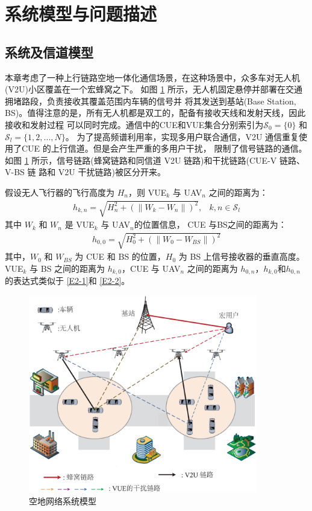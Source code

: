 \section{系统模型与问题描述}\label{section2-2}
\subsection{系统及信道模型}\label{section2-2-1}
本章考虑了一种上行链路空地一体化通信场景，在这种场景中，众多车对无人机(V2U)小区覆盖在一个宏蜂窝之下。
如图 \ref{天地网络系统模型} 所示，无人机固定悬停并部署在交通拥堵路段，负责接收其覆盖范围内车辆的信号并
将其发送到基站(Base Station, BS)。值得注意的是，所有无人机都是双工的，配备有接收天线和发射天线，因此接收和发射过程
可以同时完成。通信中的CUE和VUE集合分别索引为$\mathcal{S}_0= \{0\}$ 和$\mathcal{S}_l=\{1, 2,..., N\}$。
为了提高频谱利用率，实现多用户联合通信，V2U 通信重复使用了CUE 的上行信道。但是会产生严重的多用户干扰，
限制了信号链路的通信。如图 \ref{天地网络系统模型} 所示，信号链路(蜂窝链路和同信道 V2U 链路)和干扰链路(CUE-V 链路、V-BS 链
路和 V2U 干扰链路)被区分开来。

假设无人飞行器的飞行高度为 $H_n$，则 VUE$_{k}$ 与 UAV$_{n}$ 之间的距离为：
\begin{eqnarray}\label{E2-1}
h_{k,n}=\sqrt{H_n^2+(\|W_k-W_n\|)^2},           &k, n\in \mathcal{S}_l
\end{eqnarray}
其中 $W_k$ 和 $W_n$ 是 VUE$_{k}$ 与 UAV$_{n}$的位置信息，  CUE 与BS之间的距离为：
\begin{eqnarray}\label{E2-2}
h_{0,0}=\sqrt{H_0^2+(\|W_0-W_{BS}\|)^2}
\end{eqnarray}
其中，$W_0$ 和 $W_{BS}$ 为 CUE 和 BS 的位置，$H_0$ 为 BS 上信号接收器的垂直高度。VUE$_{k}$ 与 BS 之间的距离为 $h_{k,0}$，CUE 与 UAV$_{n}$ 之间的距离为 $h_{0,n}$，$h_{k,0}$和$h_{0,n}$的表达式类似于 \eqref{E2-1}和 \eqref{E2-2}。

\begin{figure}[H]
\centering
\includegraphics[width=10cm]{figures//chap2//第二章系统模型.eps}
\caption{空地网络系统模型}
\label{天地网络系统模型}
\end{figure}

